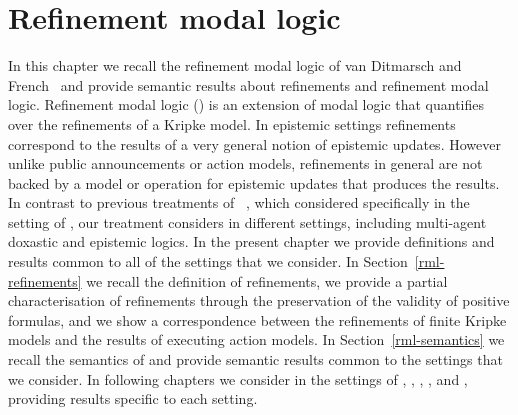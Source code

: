 \chapter{Refinement modal logic}\label{rml}

In this chapter we recall the refinement modal logic of van Ditmarsch and French~\cite{vanditmarsch:2009} and provide semantic results about refinements and refinement modal logic.
Refinement modal logic (\logicRml{}) is an extension of modal logic that quantifies over the refinements of a Kripke model.
In epistemic settings refinements correspond to the results of a very general notion of epistemic updates.
However unlike public announcements or action models, refinements in general are not backed by a model or operation for epistemic updates that produces the results.  
In contrast to previous treatments of \logicRml{}~\cite{vanditmarsch:2009,vanditmarsch:2010}, which considered \logicRml{} specifically in the setting of \classK{}, our treatment considers \logicRml{} in different settings, including multi-agent doxastic and epistemic logics.
In the present chapter we provide definitions and results common to all of the settings that we consider.
In Section~\ref{rml-refinements} we recall the definition of refinements, we provide a partial characterisation of refinements through the preservation of the validity of positive formulas, and we show a correspondence between the refinements of finite Kripke models and the results of executing action models.
In Section~\ref{rml-semantics} we recall the semantics of \logicRml{} and provide semantic results common to the settings that we consider.
In following chapters we consider \logicRml{} in the settings of \classK{}, \classKFF{}, \classKD{}, \classS{}, and \classKF{}, providing results specific to each setting.



